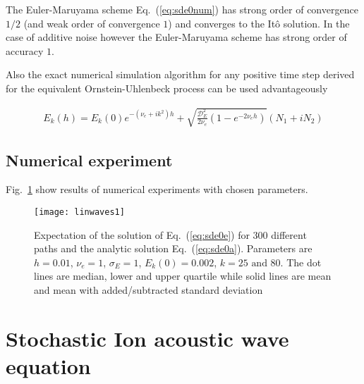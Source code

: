 \documentclass[10pt,a4paper]{article}
\newcommand{\eq}[1]{Eq.~(#1)}
\newcommand{\fig}[1]{Fig.~#1}
\newcommand{\src}{\ensuremath{\mathcal{D}}}
\begin{document}
The Euler-Maruyama scheme \eq{\ref{eq:sde0num}} has strong order of convergence $1/2$ (and weak
order of convergence $1$) and converges to the Itô solution. In the case of additive noise
however the Euler-Maruyama scheme has strong order of accuracy $1$.

Also the exact numerical simulation algorithm for any positive
time step derived for the equivalent Ornstein-Uhlenbeck process \citep{gillespie:1996b} can be
used advantageously 

\begin{align}
E_k(h) = E_k(0)e^{-(\nu_e{+}ik^2)h}+\sqrt{\frac{\src_E^2}{2\nu_e}(1-e^{-2\nu_eh})}
\left(N_1+i N_2\right)\label{eq:sde0e}
\end{align}

\subsection{Numerical experiment}

\fig{\ref{fig:linwaves1}} show results of numerical experiments with chosen parameters.

\begin{figure}[ht]
\centering\texttt{[image: linwaves1]}
\caption{Expectation of the solution of \eq{\ref{eq:sde0e}} for 300
different paths and the analytic solution \eq{\ref{eq:sde0a}}. Parameters are
$h=0.01$, $\nu_e=1$, $\sigma_E=1$, $E_k(0)=0.002$, $k=25\mbox{ and }80$.
The dot lines are median, lower and upper quartile while solid lines are mean and mean with
added/subtracted standard deviation }
\label{fig:linwaves1}
\end{figure}


\section{Stochastic Ion acoustic wave equation}
\end{document}
